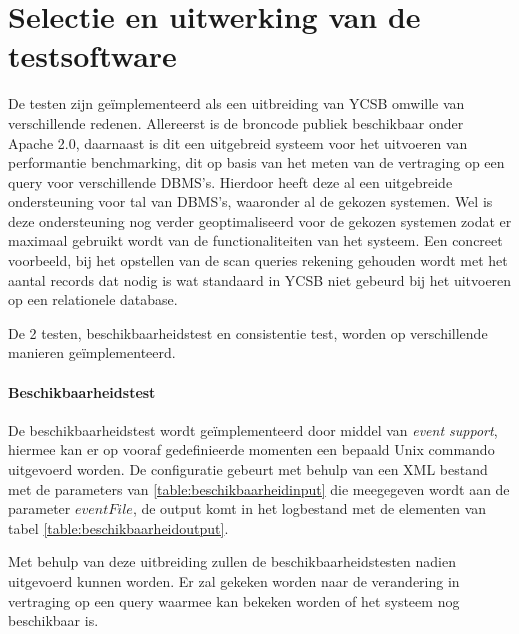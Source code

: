 \section{Selectie en uitwerking van de testsoftware}
De testen zijn geïmplementeerd als een uitbreiding van YCSB\cite{cooper2010benchmarking} omwille van verschillende redenen. Allereerst is de broncode publiek beschikbaar onder Apache 2.0, daarnaast is dit een uitgebreid systeem voor het uitvoeren van performantie benchmarking, dit op basis van het meten van de vertraging op een query voor verschillende DBMS's. Hierdoor heeft deze al een uitgebreide ondersteuning voor tal van DBMS's, waaronder al de gekozen systemen. Wel is deze ondersteuning nog verder geoptimaliseerd voor de gekozen systemen zodat er maximaal gebruikt wordt van de functionaliteiten van het systeem. Een concreet voorbeeld, bij het opstellen van de scan queries rekening gehouden wordt met het aantal records dat nodig is wat standaard in YCSB niet gebeurd bij het uitvoeren op een relationele database. 

De 2 testen, beschikbaarheidstest en consistentie test, worden op verschillende manieren geïmplementeerd. 

\paragraph{Beschikbaarheidstest} De beschikbaarheidstest wordt geïmplementeerd door middel van \textit{event support}, hiermee kan er op vooraf gedefinieerde momenten een bepaald Unix commando uitgevoerd worden. De configuratie gebeurt met behulp van een XML bestand met de parameters van \ref{table:beschikbaarheidinput} die meegegeven wordt aan de parameter $eventFile$, de output komt in het logbestand met de elementen van tabel \ref{table:beschikbaarheidoutput}. 

Met behulp van deze uitbreiding zullen de beschikbaarheidstesten nadien uitgevoerd kunnen worden. Er zal gekeken worden naar de verandering in vertraging op een query waarmee kan bekeken worden of het systeem nog beschikbaar is. 

